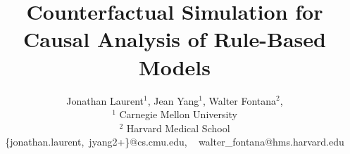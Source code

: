 \documentclass{article}
\title{
  \setstretch{1.15}
  Counterfactual Simulation for Causal Analysis of
  Rule-Based Models
}
\author{
  Jonathan Laurent$^1$,
  Jean Yang$^1$,
  Walter Fontana$^2$, \\
  $^1$ Carnegie Mellon University \\
  $^2$ Harvard Medical School \\
  \{jonathan.laurent,\ jyang2+\}@cs.cmu.edu, \ 
  walter\_fontana@hms.harvard.edu
}
\begin{document}
\maketitle










%
%
%
%
%
%



\nocite{*}


\end{document}
